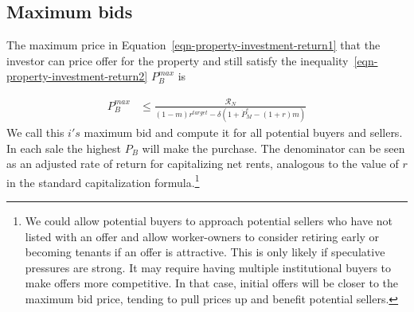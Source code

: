 % 
% 
% 

\subsection{Maximum bids}
The maximum price in Equation~\ref{eqn-property-investment-return1} that the investor can price offer for the property  and still satisfy the inequality~\ref{eqn-property-investment-return2} $P_B^{max}$ is

\begin{eqnarray}
P_B^{max} & \le    \frac{\mathcal{R}_N}{(1-m)r^{target}-\delta \left(1 + \dot P_M^e - (1+r)m\right)} \label{eqn-bid-price} \end{eqnarray}
We call this  $i's$ maximum bid and compute it for all potential buyers and sellers. In each sale the highest $P_B$ will make the purchase. The denominator can be seen as an adjusted rate of return for capitalizing net rents, analogous to the value of $r$ in  the standard capitalization formula.\footnote{We could allow potential buyers  to approach potential sellers who have not listed with an offer and allow worker-owners to consider retiring early or becoming tenants if an offer is attractive.  This is only likely if speculative pressures are strong. It may require having multiple institutional buyers to make offers more competitive. In that case, initial offers will be closer to the maximum bid price, tending to pull prices up and benefit potential sellers.}  

